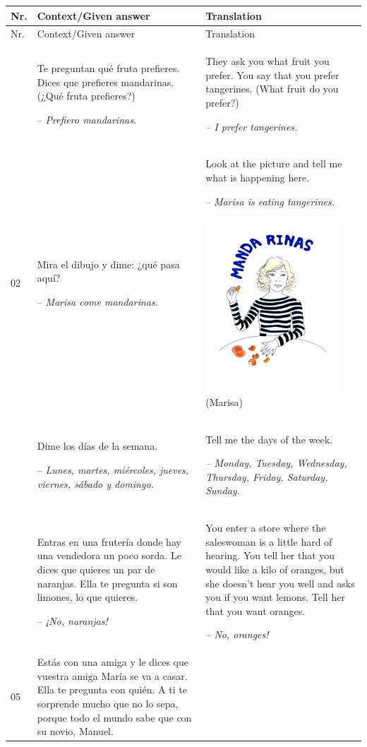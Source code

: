 \begin{xltabular}{\textwidth}{lQQ}
\lsptoprule
Nr. & Context\slash Given answer & Translation\\\midrule\endfirsthead
\midrule Nr. & Context\slash Given answer & Translation\\\midrule\endhead
\endfoot\lspbottomrule{} & Te preguntan qué fruta prefieres. Dices que prefieres mandarinas. (¿Qué fruta prefieres?)

-- \textit{Prefiero mandarinas.} & They ask you what fruit you prefer. You say that you prefer tangerines. (What fruit do you prefer?)

{\itshape -- I prefer tangerines.}\\
02 & Mira el dibujo y dime: ¿qué pasa aquí?

-- \textit{Marisa come mandarinas.} & Look at the picture and tell me what is happening here.

-- \textit{Marisa is eating tangerines.}


\includegraphics[width=.3\textwidth]{figures/a08HabilAppendix-img001.png}
 (Marisa)\\
  & Dime los días de la semana.

-- \textit{Lunes, martes, miércoles, jueves, viernes, sábado y domingo.} & Tell me the days of the week.

{\itshape -- Monday, Tuesday, Wednesday, Thursday, Friday, Saturday, Sunday.}\\
 & Entras en una frutería donde hay una vendedora un poco sorda. Le dices que quieres un par de naranjas. Ella te pregunta si son limones, lo que quieres.

\textit{-- ¡No, naranjas!} & You enter a store where the saleswoman is a little hard of hearing. You tell her that you would like a kilo of oranges, but she doesn’t hear you well and asks you if you want lemons. Tell her that you want oranges.

{\itshape -- No, oranges!}\\
05 & Estás con una amiga y le dices que vuestra amiga María se va a casar. Ella te pregunta con quién. A ti te sorprende mucho que no lo sepa, porque todo el mundo sabe que con su novio, Manuel.


\end{xltabular}
